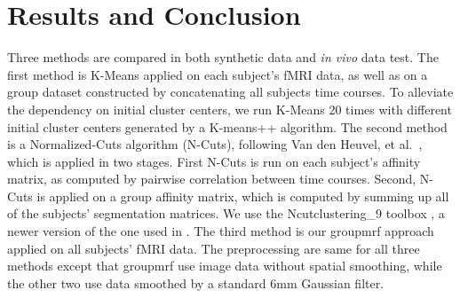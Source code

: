 \documentclass[runningheads,a4paper]{llncs}
\begin{document}
\section{Results and Conclusion}
\label{sec:results}

Three methods are compared in both  synthetic data and \emph{in vivo} data
test. The first method is \textsf{K-Means} \cite{bellec2010multi} applied on
each subject's fMRI data, as well as on a group dataset constructed by
concatenating all subjects time courses. To alleviate the dependency on initial
cluster centers, we run \textsf{K-Means} 20 times with different initial cluster
centers generated by a \textsf{K-means++} algorithm. The second method is a
Normalized-Cuts algorithm (\textsf{N-Cuts}), following Van den Heuvel, et
al.~\cite{van2008normalized}, which is applied in two stages. First N-Cuts is
run on each subject's affinity matrix, as computed by pairwise
correlation between time courses. Second, N-Cuts is applied on a group affinity
matrix, which is computed by summing up all of the subjects' segmentation
matrices. We use the \textsf{Ncutclustering\_9} toolbox
\cite{shi2000normalized}, a newer version of the one used in
\cite{van2008normalized}. The third method is our \textsf{groupmrf} approach
applied on all subjects' fMRI data. The preprocessing are same for all three
methods except that \textsf{groupmrf} use image data without spatial smoothing,
while the other two use data smoothed by a standard 6mm Gaussian filter.
\vspace*{-8pt}
\end{document}
